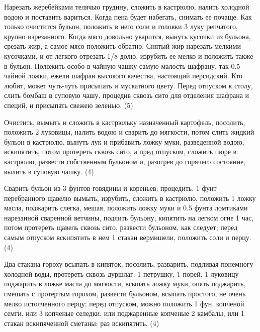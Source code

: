 
Нарезать жеребейками телячью грудину, сложить в кастрюлю, налить холодной водою и поставить вариться. Когда пена будет набегать, снимать ее почаще. Как только очистится бульон, положить в него соли и головки 3 луку репчатого, крупно изрезанного. Когда мясо довольно уварится, вынуть кусочки из бульона, срезать жир, а самое мясо положить обратно. Снятый жир нарезать мелкими кусочками, и от легкого отрезать 1/8 долю, изрубить ее мелко и положить также в бульон. Положить особо в чайную чашку самую малость шафрану, так 0.5 чайной ложки, ежели шафран высокого качества, настоящий персидский. Кто любит, может чуть-чуть присыпать и мускатного цвету. Перед отпуском к столу, слить бомбаш в суповую чашу, процедив сквозь сито для отделения шафрана и специй, и присыпать свежею зеленью. (5)


Очистить, вымыть и сложить в кастрюльку назначенный картофель, посолить, положить 2 луковицы, налить водою и сварить до мягкости, потом слить жидкий бульон в кастрюлю, вынуть лук и прибавить ложку муки, разведенной водою, вскипятить, потом протереть сквозь сито, а пред отпуском, сложить пюре в кастрюлю, развести собственным бульоном и, разогрев до горячего состояние, вылить в суповую чашку. (4)


Сварить бульон из 3 фунтов говядины и кореньев; процедить.
1 фунт перебранного щавелю вымыть, изрубить, сложить в кастрюлю, положить 1 ложку масла, поджарить слегка, мешая, положить ложку муки и 0.5 фунта ломтиками нарезанной сваренной ветчины, подлить бульону, кипятить на легком огне 1 час, потом протереть щавель сквозь сито, развести бульоном, как следует; перед самым отпуском вскипятить в нем 1 стакан вермишели, положить соли и перцу. (4)


Два стакана гороху всыпать в кипяток, посолить, разварить, подливая понемногу холодной воды, протереть сквозь дуршлаг. 1 петрушку, 1 порей, 1 луковицу поджарить в ложке масла до мягкости, всыпать ложку муки, опять поджарить, смешать с протертым горохом, развести бульоном, всыпать простого, не очень мелко истолченного перцу; перед отпуском, можно положить 1 фун. копченой семги, или 3 копченые селедки, или поджаренные копченые 2 камбалы, или 1 стакан вскипяченной сметаны; раз вскипятить. (4)

